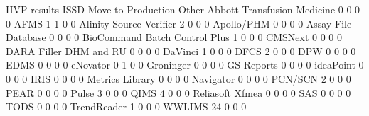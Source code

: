 \documentclass{article}
\begin{document}
\begin{Schunk}
\begin{Soutput}
                                IIVP results ISSD Move to Production Other
  Abbott Transfusion Medicine              0    0                  0     0
  AFMS                                     1    1                  0     0
  Alinity Source Verifier                  2    0                  0     0
  Apollo/PHM                               0    0                  0     0
  Assay File Database                      0    0                  0     0
  BioCommand Batch Control Plus            1    0                  0     0
  CMSNext                                  0    0                  0     0
  DARA Filler DHM and RU                   0    0                  0     0
  DaVinci                                  1    0                  0     0
  DFCS                                     2    0                  0     0
  DPW                                      0    0                  0     0
  EDMS                                     0    0                  0     0
  eNovator                                 0    1                  0     0
  Groninger                                0    0                  0     0
  GS Reports                               0    0                  0     0
  ideaPoint                                0    0                  0     0
  IRIS                                     0    0                  0     0
  Metrics Library                          0    0                  0     0
  Navigator                                0    0                  0     0
  PCN/SCN                                  2    0                  0     0
  PEAR                                     0    0                  0     0
  Pulse                                    3    0                  0     0
  QIMS                                     4    0                  0     0
  Reliasoft Xfmea                          0    0                  0     0
  SAS                                      0    0                  0     0
  TODS                                     0    0                  0     0
  TrendReader                              1    0                  0     0
  WWLIMS                                  24    0                  0     0
                               

\end{Soutput}
\end{Schunk}
\end{document}
